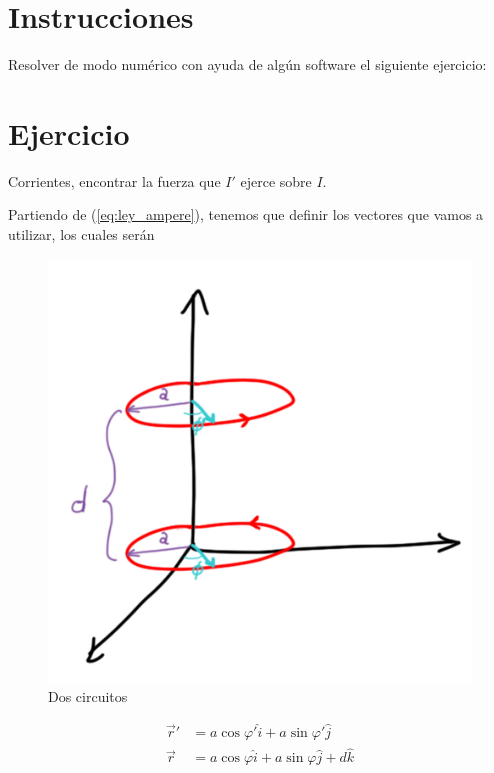 \documentclass[11pt]{report}
\theoremstyle{plain}
\theoremstyle{definition}
\begin{document}


\section*{Instrucciones}
Resolver de modo numérico con ayuda de algún software el siguiente ejercicio:

\section*{Ejercicio}

	Corrientes, encontrar la fuerza que $I'$ ejerce sobre $I$.
	
	Partiendo de (\ref{eq:ley_ampere}), tenemos que definir los vectores que vamos a utilizar, los cuales serán
	
	
	\begin{figure}[!h]%
		\centering
		\includegraphics[scale=0.15]{Tarea2_figura.png}
		\caption{Dos circuitos}
		\label{fig:Tarea2}
	\end{figure}
	
	\begin{align*}%
		\vec{r}' &= a\cos\varphi'\hat{i} + a\sin\varphi'\hat{j}\\
		\vec{r} &= a\cos\varphi\hat{i} + a\sin\varphi\hat{j}+d\hat{k}\\
	\end{align*}
	
\end{document}
